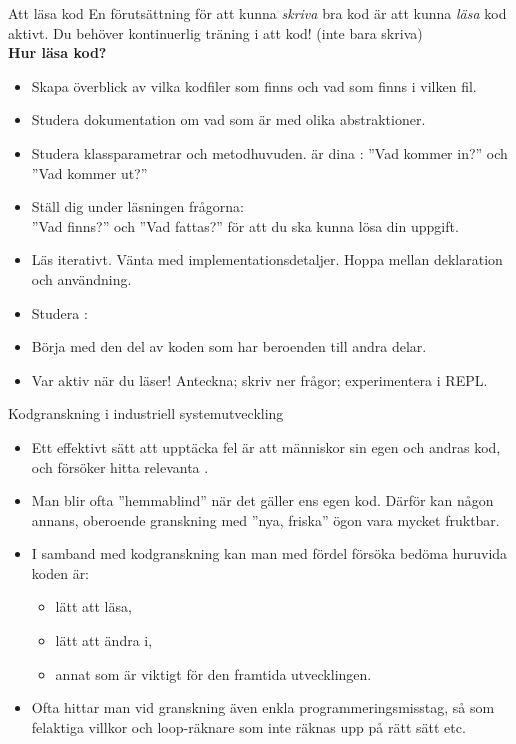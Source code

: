 


\begin{Slide}{Att läsa kod} \SlideFontSmall
  En förutsättning för att kunna \emph{skriva} bra kod är att kunna \emph{läsa} kod aktivt. Du behöver kontinuerlig träning i att  kod! (inte bara skriva)\\ \vspace{0.5em}\textbf{Hur läsa kod?}
  \begin{itemize}\SlideFontSmall
    \item Skapa överblick av vilka kodfiler som finns och vad som finns i vilken fil.
    \item Studera dokumentation om vad som är  med olika abstraktioner.
    \item Studera klassparametrar och metodhuvuden.  är dina : ''Vad kommer in?'' och ''Vad kommer ut?''
    \item Ställ dig under läsningen frågorna: \\ ''Vad finns?'' och ''Vad fattas?'' för att du ska kunna lösa din uppgift.
    \item Läs iterativt. Vänta med implementationsdetaljer. Hoppa mellan deklaration och användning.
    \item Studera : 
    \item Börja med den del av koden som har  beroenden till andra delar.
    \item Var aktiv när du läser! Anteckna; skriv ner frågor; experimentera i REPL.
  \end{itemize}
\end{Slide}

\begin{Slide}{Kodgranskning i industriell systemutveckling}
\begin{itemize}
\item Ett effektivt sätt att upptäcka fel är att människor  sin egen och andras kod, och försöker hitta relevanta . 
\item Man blir ofta ''hemmablind'' när det gäller ens egen kod. Därför kan någon annans, oberoende granskning med ''nya, friska'' ögon vara mycket fruktbar. 
\item I samband med kodgranskning kan man med fördel försöka bedöma  huruvida koden är:
\begin{itemize}
\item lätt att läsa, 
\item lätt att ändra i,  
\item annat som är viktigt för den framtida utvecklingen.
\end{itemize}
\item Ofta hittar man vid granskning även enkla programmeringsmisstag, så som felaktiga villkor och loop-räknare som inte räknas upp på rätt sätt etc.
\end{itemize}
\end{Slide}

